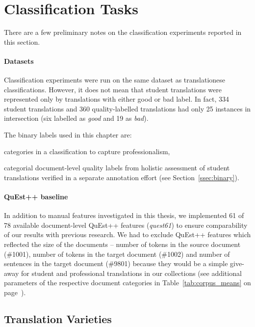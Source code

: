 \section{\label{sec:labels}Classification Tasks}

There are a few preliminary notes on the classification experiments reported in this section. 

\paragraph{Datasets} 
Classification experiments were run on the same dataset as translationese classifications. However, it does not mean that student translations were represented only by translations with either good or bad label. In fact, 334 student translations and 360 quality-labelled translations had only 25 instances in intersection (six labelled as \textit{good} and 19 as \textit{bad}). 

The binary labels used in this chapter are: 
\begin{description}\compresslist{}
	\item[stu vs pro:] categories in a classification to capture professionalism,
	\item[bad vs good:] categorial document-level quality labels from holistic assessment of student translations verified in a separate annotation effort (see Section~\ref{ssec:binary}).
\end{description}

\paragraph{QuEst++ baseline}
In addition to manual features investigated in this thesis, we implemented 61 of 78 available document-level QuEst++ features (\textit{quest61}) to ensure comparability of our results with previous research.
We had to exclude QuEst++ features which reflected the size of the documents -- number of tokens in the source document (\#1001), number of tokens in the target document (\#1002) and number of sentences in the target document (\#9801) because they would be a simple give-away for student and professional translations in our collections (see additional parameters of the respective document categories in Table~\ref{tab:corpus_means} on page~\pageref{tab:corpus_means}).  

\subsection{\label{ssec:var}Translation Varieties}

